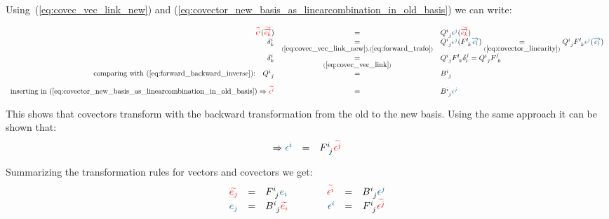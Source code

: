 Using~(\ref{eq:covec_vec_link_new}) and
(\ref{eq:covector_new_basis_as_linearcombination_in_old_basis}) we can write:

\begin{equation}
    \label{eq:covector_transformation_rule} 
    \begin{array}{rcl}
        \hdcbtvc{i}(\hdbtv{k}) & = &
        Q^{i~}_{~j}\hdcbvc{j}(\hdbtv{k}) \\
        \delta^i_k &
        \underset{(\ref{eq:covec_vec_link_new}),(\ref{eq:forward_trafo})}{=} &
        Q^{i~}_{~j}\hdcbvc{j}(F^{l~}_{~k}\hdbv{l})
        \underset{(\ref{eq:covector_linearity})}{=}
        Q^{i~}_{~j} F^{l~}_{~k}\hdcbvc{j}(\hdbv{l}) \\
        \delta^i_k &
        \underset{(\ref{eq:covec_vec_link})}{=} &
        Q^{i~}_{~j} F^{l~}_{~k} \delta^j_l = Q^{i~}_{~j} F^{j~}_{~k} \\
        \text{comparing with~(\ref{eq:forward_backward_inverse}):\quad}
        Q^{i~}_{~j} & = & B^{i~}_{~j} \\
        \noalign{\vskip10pt}
        \text{inserting in~(\ref{eq:covector_new_basis_as_linearcombination_in_old_basis})}
        \Rightarrow \hdcbtvc{i} & = & B^{i~}_{~j}\hdcbvc{j}
    \end{array}
\end{equation}

This shows that covectors transform with the backward transformation from the old to the
new basis. Using the same approach it can be shown that:
\begin{equation}
    \label{eq:covector_transformation_rule_new}
    \begin{array}{rcl}
        \Rightarrow \hdcbvc{i} & = & F^{i~}_{~j}\hdcbtvc{j}
    \end{array}
\end{equation}

Summarizing the transformation rules for vectors and covectors we get:
\begin{equation}
    \label{eq:vector_covector_trafo_overview}
    \begin{array}{rclrcl}
      \hdbtvc{j} & = & F^{i~}_{~j}\hdbvc{i}
      \qquad\qquad
      \hdcbtvc{i} & = & B^{i~}_{~j} \hdcbvc{j} \\
      \hdbvc{j} & = & B^{i~}_{~j}\hdbtvc{i}
      \qquad\qquad
      \hdcbvc{i} & = &  F^{i~}_{~j} \hdcbtvc{j}
    \end{array}
  \end{equation}

